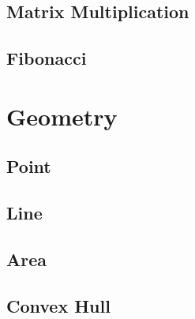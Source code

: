     \subsection{Matrix Multiplication}
        
    \subsection{Fibonacci}
        

\section{Geometry}
    \subsection{Point}
        
    \subsection{Line}
        
    \subsection{Area}
        
    \subsection{Convex Hull}
        